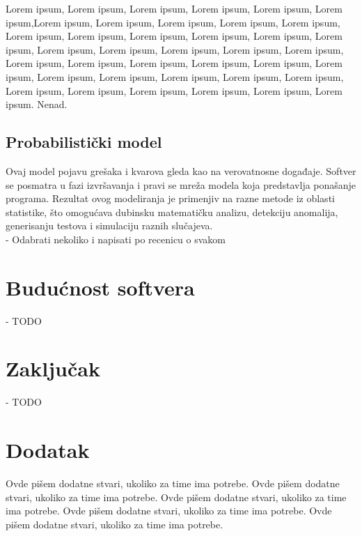 \documentclass[a4paper]{article}
\begin{document}
Lorem ipsum, Lorem ipsum, Lorem ipsum, Lorem ipsum, Lorem ipsum, Lorem ipsum,Lorem ipsum, Lorem ipsum, Lorem ipsum, Lorem ipsum, Lorem ipsum, Lorem ipsum, Lorem ipsum, Lorem ipsum, Lorem ipsum, Lorem ipsum, Lorem ipsum, Lorem ipsum, Lorem ipsum, Lorem ipsum, Lorem ipsum, Lorem ipsum, Lorem ipsum, Lorem ipsum, Lorem ipsum, Lorem ipsum, Lorem ipsum, Lorem ipsum, Lorem ipsum, Lorem ipsum, Lorem ipsum, Lorem ipsum, Lorem ipsum, Lorem ipsum, Lorem ipsum, Lorem ipsum, Lorem ipsum, Lorem ipsum, Lorem ipsum. Nenad.

\subsection{Probabilistički model}
\label{sec:probabilisticki}

Ovaj model pojavu grešaka i kvarova gleda kao na verovatnosne događaje. Softver se posmatra u fazi izvršavanja i pravi se mreža modela koja predstavlja ponašanje programa. Rezultat ovog modeliranja je primenjiv na razne metode iz oblasti statistike, što omogućava dubinsku matematičku analizu, detekciju anomalija, generisanju testova i simulaciju raznih slučajeva. \\


- Odabrati nekoliko i napisati po recenicu o svakom \\


\section{Budućnost softvera}
\label{buducnost}

- TODO \\

\section{Zaključak}
\label{sec:zakljucak}

- TODO \\

\appendix
 


\appendix
\section{Dodatak}
Ovde pišem dodatne stvari, ukoliko za time ima potrebe.
Ovde pišem dodatne stvari, ukoliko za time ima potrebe.
Ovde pišem dodatne stvari, ukoliko za time ima potrebe.
Ovde pišem dodatne stvari, ukoliko za time ima potrebe.
Ovde pišem dodatne stvari, ukoliko za time ima potrebe.
\end{document}
